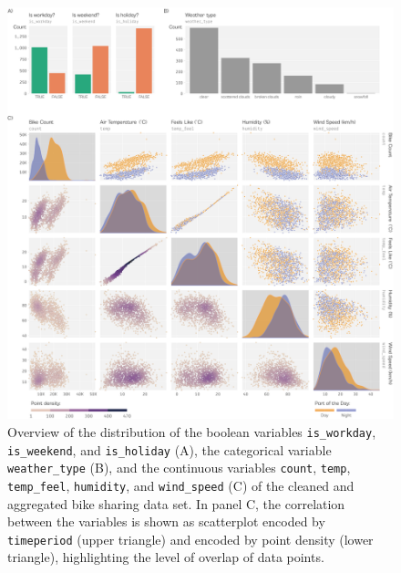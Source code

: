 \documentclass[
]{krantz}
\begin{document}
\begin{figure}
\centering
\includegraphics{./img/setup-data-comparison-all-dodge.png}
\caption{\label{fig:03imgDataOverviewVars}Overview of the distribution of the boolean variables \texttt{is\_workday}, \texttt{is\_weekend}, and \texttt{is\_holiday} (A), the categorical variable \texttt{weather\_type} (B), and the continuous variables \texttt{count}, \texttt{temp}, \texttt{temp\_feel}, \texttt{humidity}, and \texttt{wind\_speed} (C) of the cleaned and aggregated bike sharing data set. In panel C, the correlation between the variables is shown as scatterplot encoded by \texttt{timeperiod} (upper triangle) and encoded by point density (lower triangle), highlighting the level of overlap of data points.}
\end{figure}
\end{document}
